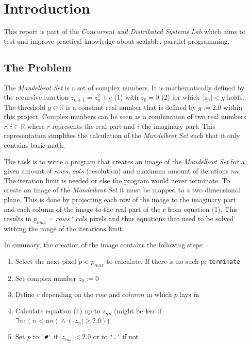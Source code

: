 \newcommand{\reporttitle}{Mandelbrot Set}
\newcommand{\ms}{\textit{Mandelbrot Set}}




\setspacings
\maketitle

\clearpage
\setcounter{page}{1}

\section{Introduction}
\label{sec:introduction}

This report is part of the \textit{Concurrent and Distributed Systems Lab} which aims to test and improve practical knowledge about scalable, parallel programming.

\subsection{The Problem}
\label{ssec:problem}

The \ms{} is a set of complex numbers. It is mathematically defined by the recursive function $z_{n+1} = z_n^2 + c$ (1) with $z_0 = 0$ (2) for which $|z_n| < g$ holds. The threshold $g \in \mathbb{R}$ is a constant real number that is defined by $ g:= 2.0$ within this project. Complex numbers can be seen as a combination of two real numbers $r, i \in \mathbb{R}$ where $r$ represents the real part and $i$ the imaginary part. This representation simplifies the calculation of the \ms{} such that it only contains basic math.

The task is to write a program that creates an image of the \ms{} for a given amount of $rows$, $cols$ (resolution) and maximum amount of iterations $nn$. The iteration limit is needed or else the program would never terminate. To create an image of the \ms{} it must be mapped to a two dimensional plane. This is done by projecting each row of the image to the imaginary part and each column of the image to the real part of the $c$ from equation (1). This results in $p_{max} = rows*cols$ pixels and thus equations that need to be solved withing the range of the iterations limit.

\noindent In summary, the creation of the image contains the following steps:
\begin{enumerate}
    \item Select the next pixel $p < p_{max}$ to calculate. If there is no such p: \verb$terminate$
    \item Set complex number $z_0 := 0$
    \item Define $c$ depending on the $row$ and $column$ in which $p$ lays in
    \item Calculate equation (1) up to $z_{nn}$ (might be less if $\exists n: (n < nn) \land (|z_n| \ge 2.0)$)
    \item Set $p$ to \verb|'#'| if $|z_{nn}| < 2.0$ or to \verb|'.'| if not
\end{enumerate}


